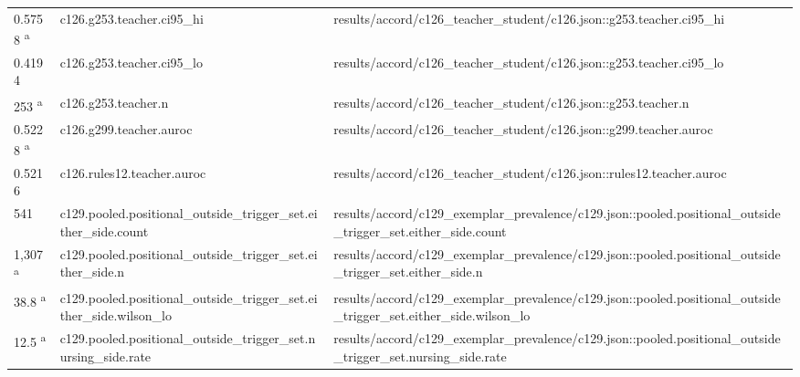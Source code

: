 \begin{longtable}{@{}p{0.7in}p{1.9in}p{2.6in}@{}}
0.5758 \textsuperscript{a} & c126.\allowbreak{}g253.\allowbreak{}teacher.\allowbreak{}ci95\_hi & results/\allowbreak{}accord/\allowbreak{}c126\_teacher\_student/\allowbreak{}c126.\allowbreak{}json::g253.\allowbreak{}teacher.\allowbreak{}ci95\_hi\\
0.4194 & c126.\allowbreak{}g253.\allowbreak{}teacher.\allowbreak{}ci95\_lo & results/\allowbreak{}accord/\allowbreak{}c126\_teacher\_student/\allowbreak{}c126.\allowbreak{}json::g253.\allowbreak{}teacher.\allowbreak{}ci95\_lo\\
253 \textsuperscript{a} & c126.\allowbreak{}g253.\allowbreak{}teacher.\allowbreak{}n & results/\allowbreak{}accord/\allowbreak{}c126\_teacher\_student/\allowbreak{}c126.\allowbreak{}json::g253.\allowbreak{}teacher.\allowbreak{}n\\
0.5228 \textsuperscript{a} & c126.\allowbreak{}g299.\allowbreak{}teacher.\allowbreak{}auroc & results/\allowbreak{}accord/\allowbreak{}c126\_teacher\_student/\allowbreak{}c126.\allowbreak{}json::g299.\allowbreak{}teacher.\allowbreak{}auroc\\
0.5216 & c126.\allowbreak{}rules12.\allowbreak{}teacher.\allowbreak{}auroc & results/\allowbreak{}accord/\allowbreak{}c126\_teacher\_student/\allowbreak{}c126.\allowbreak{}json::rules12.\allowbreak{}teacher.\allowbreak{}auroc\\
541 & c129.\allowbreak{}pooled.\allowbreak{}positional\_outside\_trigger\_set.\allowbreak{}either\_side.\allowbreak{}count & results/\allowbreak{}accord/\allowbreak{}c129\_exemplar\_prevalence/\allowbreak{}c129.\allowbreak{}json::pooled.\allowbreak{}positional\_outside\_trigger\_set.\allowbreak{}either\_side.\allowbreak{}count\\
1,307 \textsuperscript{a} & c129.\allowbreak{}pooled.\allowbreak{}positional\_outside\_trigger\_set.\allowbreak{}either\_side.\allowbreak{}n & results/\allowbreak{}accord/\allowbreak{}c129\_exemplar\_prevalence/\allowbreak{}c129.\allowbreak{}json::pooled.\allowbreak{}positional\_outside\_trigger\_set.\allowbreak{}either\_side.\allowbreak{}n\\
38.8 \textsuperscript{a} & c129.\allowbreak{}pooled.\allowbreak{}positional\_outside\_trigger\_set.\allowbreak{}either\_side.\allowbreak{}wilson\_lo & results/\allowbreak{}accord/\allowbreak{}c129\_exemplar\_prevalence/\allowbreak{}c129.\allowbreak{}json::pooled.\allowbreak{}positional\_outside\_trigger\_set.\allowbreak{}either\_side.\allowbreak{}wilson\_lo\\
12.5 \textsuperscript{a} & c129.\allowbreak{}pooled.\allowbreak{}positional\_outside\_trigger\_set.\allowbreak{}nursing\_side.\allowbreak{}rate & results/\allowbreak{}accord/\allowbreak{}c129\_exemplar\_prevalence/\allowbreak{}c129.\allowbreak{}json::pooled.\allowbreak{}positional\_outside\_trigger\_set.\allowbreak{}nursing\_side.\allowbreak{}rate\\

\end{longtable}
